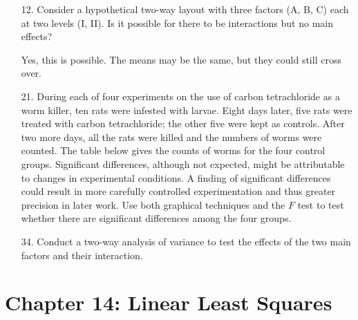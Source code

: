 \documentclass{article}
\begin{document}
\begin{itemize}
	\item[12.] Consider a hypothetical two-way layout with three factors (A, B, C) each at two levels (I, II). Is it possible for there to be interactions but no main effects?
		\begin{answer*}
			Yes, this is possible. The means may be the same, but they could still cross over.
		\end{answer*}

	\item[21.] During each of four experiments on the use of carbon tetrachloride as a worm killer, ten rats were infested with larvae. Eight days later, five rats were treated with carbon tetrachloride; the other five were kept as controls. After two more days, all the rats were killed and the numbers of worms were counted. The table below gives the counts of worms for the four control groups. Significant differences, although not expected, might be attributable to changes in experimental conditions. A finding of significant differences could result in more carefully controlled experimentation and thus greater precision in later work. Use both graphical techniques and the $F$ test to test whether there are significant differences among the four groups. 

	\item[34.] Conduct a two-way analysis of variance to test the effects of the two main factors and their interaction.

\end{itemize}

\section*{Chapter 14: Linear Least Squares}
\end{document}
